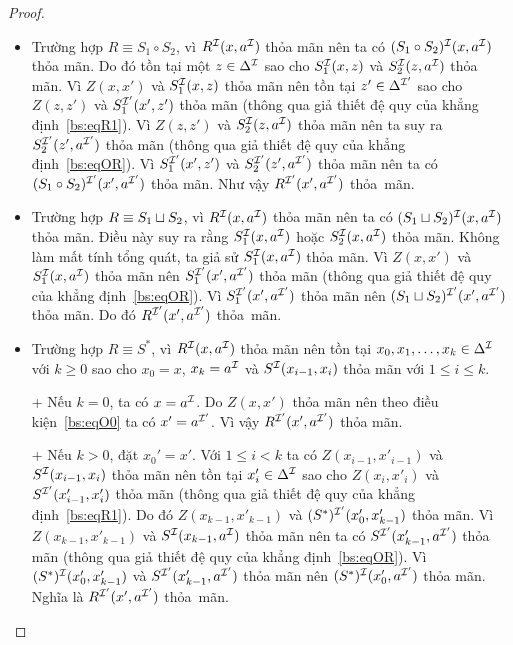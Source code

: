 \begin{proof}
\begin{itemize}
		\item Trường hợp $R \equiv S_1 \circ S_2$, vì $R^{\mathcal{I}}(x, a^{\mathcal{I}})$ thỏa mãn nên ta có $(S_1 \circ S_2)^{\mathcal{I}}(x,a^{\mathcal{I}})$ thỏa mãn. Do đó tồn tại một $z \in \Delta^{\mathcal{I}}$ sao cho $S_1^{\mathcal{I}}(x,z)$ và $S_2^{\mathcal{I}}(z,a^{\mathcal{I}})$ thỏa mãn. Vì $Z(x,x')$ và $S_1^{\mathcal{I}}(x,z)$ thỏa mãn nên tồn tại $z' \in \Delta^{\mathcal{I}'}$ sao cho $Z(z,z')$ và $S_1^{\mathcal{I}'}(x',z')$ thỏa mãn (thông qua giả thiết đệ quy của khẳng định~\eqref{bs:eqR1}). Vì $Z(z,z')$ và $S_2^{\mathcal{I}}(z,a^{\mathcal{I}})$ thỏa mãn nên ta suy ra $S_2^{\mathcal{I}'}(z',a^{\mathcal{I}'})$ thỏa mãn (thông qua giả thiết đệ quy của khẳng định~\eqref{bs:eqOR}). Vì $S_1^{\mathcal{I}'}(x',z')$ và $S_2^{\mathcal{I}'}(z',a^{\mathcal{I}'})$ thỏa mãn nên ta có $(S_1 \circ S_2)^{\mathcal{I}'}(x',a^{\mathcal{I}'})$ thỏa mãn. Như vậy $R^{\mathcal{I}'}(x',a^{\mathcal{I}'})$ thỏa~mãn.
		
		\item Trường hợp $R \equiv S_1 \sqcup S_2$, vì $R^{\mathcal{I}}(x, a^{\mathcal{I}})$ thỏa mãn nên ta có $(S_1 \sqcup S_2)^{\mathcal{I}}(x,a^{\mathcal{I}})$ thỏa mãn. Điều này suy ra rằng $S_1^{\mathcal{I}}(x,a^{\mathcal{I}})$ hoặc $S_2^{\mathcal{I}}(x,a^{\mathcal{I}})$ thỏa mãn. Không làm mất tính tổng quát, ta giả sử $S_1^{\mathcal{I}}(x,a^{\mathcal{I}})$ thỏa mãn. Vì $Z(x,x')$ và $S_1^{\mathcal{I}}(x,a^{\mathcal{I}})$ thỏa mãn nên $S_1^{\mathcal{I}'}(x',a^{\mathcal{I}'})$ thỏa mãn (thông qua giả thiết đệ quy của khẳng định~\eqref{bs:eqOR}). Vì $S_1^{\mathcal{I}'}(x',a^{\mathcal{I}'})$ thỏa mãn nên $(S_1 \sqcup S_2)^{\mathcal{I}'}(x',a^{\mathcal{I}'})$ thỏa mãn. Do đó $R^{\mathcal{I}'}(x',a^{\mathcal{I}'})$ thỏa~mãn.
		
		\item Trường hợp $R \equiv S^*$, vì $R^{\mathcal{I}}(x,a^{\mathcal{I}})$ thỏa mãn nên tồn tại $x_0, x_1, \ldots, x_k \in \Delta^{\mathcal{I}}$ với $k \geq 0$ sao cho $x_0 = x$, $x_k = a^{\mathcal{I}}$ và $S^{\mathcal{I}}(x_{i-1}, x_i)$ thỏa mãn với $1 \leq i \leq k$. 
		
		+ Nếu $k=0$, ta có $x=a^{\mathcal{I}}$. Do $Z(x,x')$ thỏa mãn nên theo điều kiện~\eqref{bs:eqO0} ta có $x' = a^{\mathcal{I}'}$. Vì vậy $R^{\mathcal{I}'}(x',a^{\mathcal{I}'})$ thỏa mãn.
		
		+ Nếu $k > 0$, đặt $x_0' = x'$. Với $1 \leq i < k$ ta có $Z(x_{i-1}, x'_{i-1})$ và $S^{\mathcal{I}}(x_{i-1}, x_i)$ thỏa mãn nên tồn tại $x'_i \in \Delta^{\mathcal{I}}$ sao cho $Z(x_i, x'_i)$ và $S^{\mathcal{I}'}(x'_{i-1}, x'_i)$ thỏa mãn (thông qua giả thiết đệ quy của khẳng định~\eqref{bs:eqR1}). Do đó $Z(x_{k-1},x'_{k-1})$ và $(S^*)^{\mathcal{I}'}(x'_0, x'_{k-1})$ thỏa mãn. Vì $Z(x_{k-1},x'_{k-1})$ và $S^{\mathcal{I}}(x_{k-1},a^{\mathcal{I}})$ thỏa mãn nên ta có $S^{\mathcal{I}'}(x'_{k-1},a^{\mathcal{I}'})$ thỏa mãn (thông qua giả thiết đệ quy của khẳng định~\eqref{bs:eqOR}). Vì $(S^*)^{\mathcal{I}}(x'_0, x'_{k-1})$ và $S^{\mathcal{I}'}(x'_{k-1},a^{\mathcal{I}'})$ thỏa mãn nên $(S^*)^{\mathcal{I}}(x'_0, a^{\mathcal{I}'})$ thỏa mãn. Nghĩa là $R^{\mathcal{I}'}(x', a^{\mathcal{I}'})$ thỏa~mãn.
		

\end{itemize}
\end{proof}
